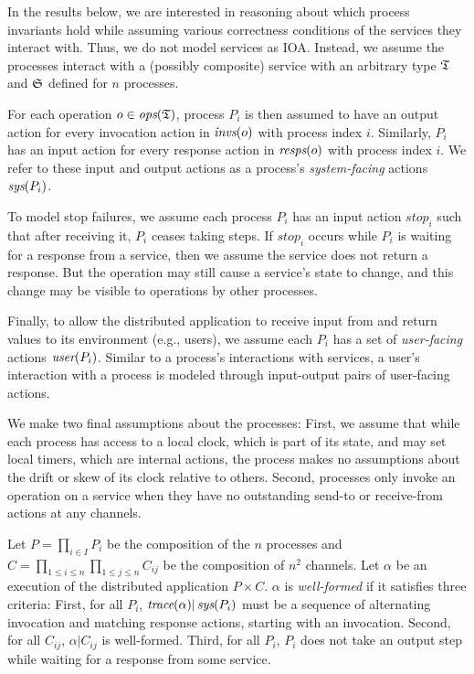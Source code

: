 In the results below, we are interested in reasoning about which process invariants hold while assuming various correctness conditions of the services they interact with. Thus, we do not model services as IOA. Instead, we assume the processes interact with a (possibly composite) service with an arbitrary type $\mathfrak{T}$ and $\mathfrak{S}$ defined for $n$ processes.

For each operation $o \in \operatorname*{\textit{ops}}(\mathfrak{T})$, process $P_i$ is then assumed to have an output action for every invocation action in $\operatorname*{\textit{invs}}(o)$ with process index $i$. Similarly, $P_i$ has an input action for every response action in $\operatorname*{\textit{resps}}(o)$ with process index $i$. We refer to these input and output actions as a process's \textit{system-facing} actions $\operatorname*{\textit{sys}}(P_i)$.

To model stop failures, we assume each process $P_i$ has an input
action $\textit{stop}_i$ such that after receiving it, $P_i$ ceases taking
steps. If $\textit{stop}_i$ occurs while $P_i$ is waiting for a response from a service, then we assume the service does not return a response. But the operation may still cause a service's state to change, and this change may be visible to operations by other processes.

Finally, to allow the distributed application to receive input from and return values to its environment (e.g., users), we assume each $P_i$ has a set of \textit{user-facing} actions $\operatorname*{\textit{user}}(P_i)$. Similar to a process's interactions with services, a user's interaction with a process is modeled through input-output pairs of user-facing actions.

We make two final assumptions about the processes: First, we assume that while
each process has access to a local clock, which is part of its state, and may
set local timers, which are internal actions, the process makes no assumptions
about the drift or skew of its clock relative to others. Second, processes only
invoke an operation on a service when they have no outstanding send-to or
receive-from actions at any channels.

Let $P = \prod_{i \in I} P_i$ be the composition of the $n$ processes and $C = \prod_{1 \leq i \leq n} \prod_{1 \leq j \leq n} C_{ij}$ be the composition of $n^2$ channels. Let $\alpha$ be an execution of the distributed application $P \times C$. $\alpha$ is \textit{well-formed} if it satisfies three criteria:
First, for all $P_i$, $\operatorname*{\textit{trace}}(\alpha) | \operatorname*{\textit{sys}}(P_i)$ must be a sequence of alternating invocation and matching response actions, starting with an invocation. Second, for all $C_{ij}$, $\alpha | C_{ij}$ is well-formed. Third, for all $P_i$, $P_i$ does not take an output step while waiting for a response from some service. 

